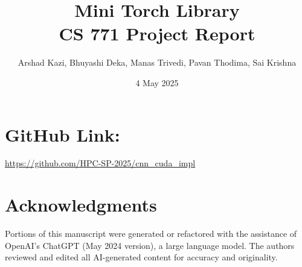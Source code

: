 \documentclass{article}
\title{Mini Torch Library\\CS 771 Project Report}
\author{Arshad Kazi, Bhuyashi Deka, Manas Trivedi, Pavan Thodima, Sai Krishna}
\date{4 May 2025}
\begin{document}
\maketitle

\section*{GitHub Link:} \url{https://github.com/HPC-SP-2025/cnn_cuda_impl}











\section*{Acknowledgments}
Portions of this manuscript were generated or refactored with the assistance of OpenAI's ChatGPT (May 2024 version), a large language model. The authors reviewed and edited all AI-generated content for accuracy and originality.

\printbibliography



\end{document}
